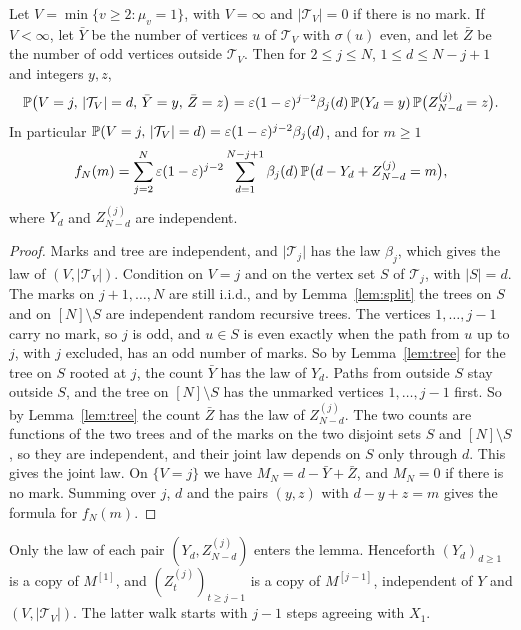 \begin{lemma}\label{lem:firstmark}
Let $V=\min\{v\ge2:\mu_v=1\}$, with $V=\infty$ and $\lvert\mathcal T_V\rvert=0$ if there is no mark. If
$V<\infty$, let $\bar Y$ be the number of vertices $u$ of $\mathcal T_V$ with $\sigma(u)$ even, and
let $\bar Z$ be the number of odd vertices outside $\mathcal T_V$. Then for $2\le j\le N$,
$1\le d\le N-j+1$ and integers $y,z$,
\[
 \mathbb{P}\bigl(V=j,\,\lvert\mathcal T_V\rvert=d,\,\bar Y=y,\,\bar Z=z\bigr)
 =\varepsilon(1-\varepsilon)^{j-2}\beta_j(d)\,\mathbb{P}(Y_d=y)\,\mathbb{P}\bigl(Z^{(j)}_{N-d}=z\bigr).
\]
In particular $\mathbb{P}(V=j,\,\lvert\mathcal T_V\rvert=d)=\varepsilon(1-\varepsilon)^{j-2}\beta_j(d)$, and for $m\ge1$
\[
 f_N(m)=\sum_{j=2}^N\varepsilon(1-\varepsilon)^{j-2}\sum_{d=1}^{N-j+1}
 \beta_j(d)\,\mathbb{P}\bigl(d-Y_d+Z^{(j)}_{N-d}=m\bigr),
\]
where $Y_d$ and $Z^{(j)}_{N-d}$ are independent.
\end{lemma}

\begin{proof}
Marks and tree are independent, and $\lvert\mathcal T_j\rvert$ has the law $\beta_j$, which gives
the law of $(V,\lvert\mathcal T_V\rvert)$. Condition on
$V=j$ and on the vertex set $S$ of $\mathcal T_j$, with $\lvert S\rvert=d$.
The marks on $j+1,\dots,N$ are still i.i.d., and by Lemma~\ref{lem:split} the
trees on $S$ and on $[N]\setminus S$ are independent random recursive trees.
The vertices $1,\dots,j-1$ carry no mark, so $j$ is odd, and $u\in S$ is even
exactly when the path from $u$ up to $j$, with $j$ excluded, has an odd
number of marks. So by Lemma~\ref{lem:tree} for the tree on $S$ rooted at
$j$, the count $\bar Y$ has the law of $Y_d$. Paths from
outside $S$ stay outside $S$, and the tree on $[N]\setminus S$ has the
unmarked vertices $1,\dots,j-1$ first. So by Lemma~\ref{lem:tree} the count
$\bar Z$ has the law of $Z^{(j)}_{N-d}$. The two counts are functions of the two
trees and of the marks on the two disjoint sets $S$ and $[N]\setminus S$, so they
are independent, and their joint law depends on $S$ only through $d$. This gives
the joint law. On $\{V=j\}$ we have $M_N=d-\bar Y+\bar Z$, and $M_N=0$ if there is
no mark. Summing over $j$, $d$ and the pairs $(y,z)$ with $d-y+z=m$ gives the
formula for $f_N(m)$.
\end{proof}

Only the law of each pair $(Y_d,Z^{(j)}_{N-d})$ enters the lemma.
Henceforth $(Y_d)_{d\ge1}$ is a copy of $M^{[1]}$, and
$(Z^{(j)}_t)_{t\ge j-1}$ is a copy of $M^{[j-1]}$, independent of $Y$
and $(V,\lvert\mathcal T_V\rvert)$. The latter walk starts with $j-1$
steps agreeing with $X_1$.

